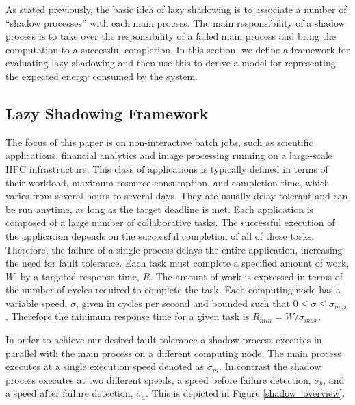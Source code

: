 As stated previously, the basic idea of lazy shadowing is to
associate a number of ``shadow processes'' with each main process. The
main responsibility of a shadow process is to take over the
responsibility of a failed main process and bring the computation to a
successful completion.  In this section, we define a framework for
evaluating lazy shadowing and then use this to derive a model for
representing the expected energy consumed by the system. %


\subsection{Lazy Shadowing Framework}
\label{shadow_computing_framework}

The focus of this paper is on non-interactive batch jobs, such as scientific applications, financial analytics and image processing running on a large-scale HPC infrastructure. This class of applications is typically defined in terms of their workload, maximum resource consumption, and completion time, which varies from several hours to several days. They are usually delay tolerant and can be run anytime, as long as the target deadline is met. Each
application is composed of a large number of collaborative tasks. The
successful execution of the application depends on the successful
completion of all of these tasks. Therefore, the failure of a single
process delays the entire application, increasing the need for fault
tolerance. Each task must complete a specified amount of work, $W$, by
a targeted response time, $R$. The amount of work is expressed in
terms of the number of cycles required to complete the task. Each
computing node has a variable speed, $\sigma$, given in cycles per
second and bounded such that $0\leq\sigma\leq\sigma_{max}$. Therefore
the minimum response time for a given task is $R_{min}=W/\sigma_{max}$.

In order to achieve our desired fault tolerance a shadow process
executes in parallel with the main process on a different computing
node. The main process executes at a single execution speed denoted as
$\sigma_m$. In contrast the shadow process executes at two different
speeds, a speed before failure detection, $\sigma_b$, and a speed
after failure detection, $\sigma_a$. This is depicted in Figure
\ref{shadow_overview}.

